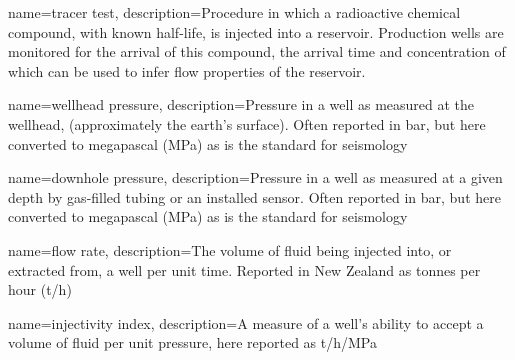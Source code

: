 

 













{
    name=tracer test,
    description={Procedure in which a radioactive chemical compound, with known half-life, is injected into a reservoir. Production wells are monitored for the arrival of this compound, the arrival time and concentration of which can be used to infer flow properties of the reservoir.}
}

{
    name=wellhead pressure,
    description={Pressure in a well as measured at the wellhead, (approximately the earth's surface). Often reported in bar, but here converted to megapascal (MPa) as is the standard for seismology}
}
 
{
    name=downhole pressure,
    description={Pressure in a well as measured at a given depth by gas-filled tubing or an installed sensor. Often reported in bar, but here converted to megapascal (MPa) as is the standard for seismology}
}

{
    name=flow rate,
    description={The volume of fluid being injected into, or extracted from, a well per unit time. Reported in New Zealand as tonnes per hour (t/h)}
}

{
    name=injectivity index,
    description={A measure of a well's ability to accept a volume of fluid per unit pressure, here reported as t/h/MPa}
}

